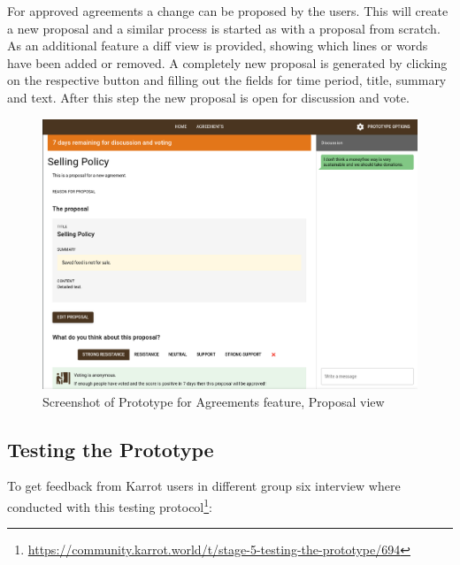 \documentclass[
	a4paper,%
	11pt,%
	]{article}
\begin{document}
For approved agreements a change can be proposed by the users. This will create a new proposal and a similar process is started as with a proposal from scratch. As an additional feature a diff view is provided, showing which lines or words have been added or removed. A completely new proposal is generated by clicking on the respective button and filling out the fields for time period, title, summary and text. After this step the new proposal is open for discussion and vote.

\begin{figure}[htb]
	\includegraphics[width=\textwidth,
	]{images/screenshot-prototype.png}
	\caption{Screenshot of Prototype for Agreements feature, Proposal view}
	\label{fig:screenshot-prototype}
\end{figure}

\subsection{Testing the Prototype}

To get feedback from Karrot users in different group six interview where conducted with this testing protocol\footnote{\label{url:5Testing}\url{https://community.karrot.world/t/stage-5-testing-the-prototype/694}}:
\end{document}
